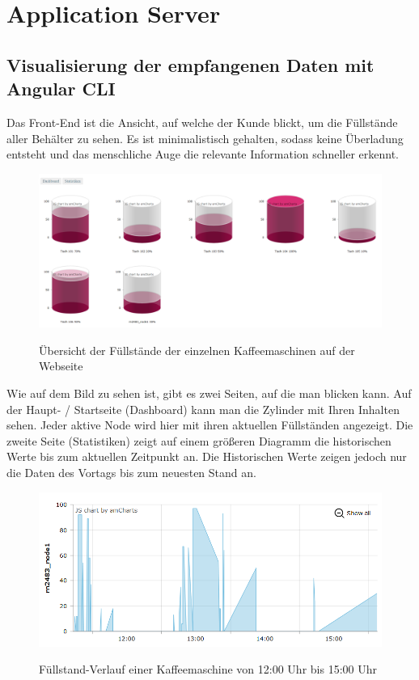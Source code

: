 \chapter{Application Server}
\section{Visualisierung der empfangenen Daten mit Angular CLI}
Das Front-End ist die Ansicht, auf welche der Kunde blickt, um die Füllstände aller Behälter zu sehen. Es ist minimalistisch gehalten, sodass keine Überladung entsteht und das menschliche Auge die relevante Information schneller erkennt. \\
\begin{figure}[ht]
    \center
    \includegraphics[width=16cm]{Bilder/front-end-1.png}\\
    \caption{Übersicht der Füllstände der einzelnen Kaffeemaschinen auf der Webseite}
\end{figure}

Wie auf dem Bild zu sehen ist, gibt es zwei Seiten, auf die man blicken kann. Auf der Haupt- / Startseite (Dashboard) kann man die Zylinder mit Ihren Inhalten sehen. Jeder aktive Node wird hier mit ihren aktuellen Füllständen angezeigt. Die zweite Seite (Statistiken) zeigt auf einem größeren Diagramm die historischen Werte bis zum aktuellen Zeitpunkt an. Die Historischen Werte zeigen jedoch nur die Daten des Vortags bis zum neuesten Stand an. 
\begin{figure}[ht]
    \center
    \includegraphics[width=16cm]{Bilder/front-end-2.png}\\
    \caption{Füllstand-Verlauf einer Kaffeemaschine von 12:00 Uhr bis 15:00 Uhr}
\end{figure}

